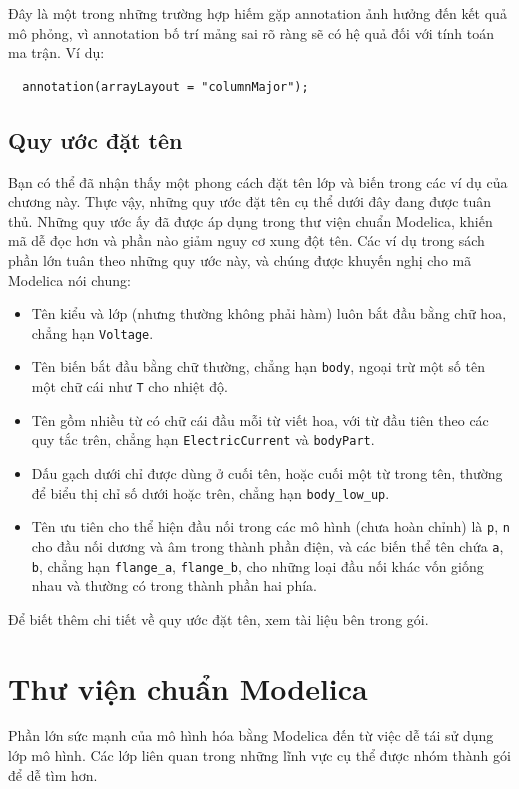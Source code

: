 Đây là một trong những trường hợp hiếm gặp annotation ảnh hưởng đến kết quả mô phỏng, vì annotation bố trí mảng sai rõ ràng sẽ có hệ quả đối với tính toán ma trận. Ví dụ:
\begin{verbatim}
  annotation(arrayLayout = "columnMajor");
\end{verbatim}

\subsection{Quy ước đặt tên}
Bạn có thể đã nhận thấy một phong cách đặt tên lớp và biến trong các ví dụ của chương này. Thực vậy, những quy ước đặt tên cụ thể dưới đây đang được tuân thủ. Những quy ước ấy đã được
áp dụng trong thư viện chuẩn Modelica, khiến mã dễ đọc hơn và phần nào giảm nguy cơ xung đột tên. Các ví dụ trong sách phần lớn tuân theo những quy ước này, và chúng được khuyến nghị cho mã Modelica nói chung:
\begin{itemize}
\item Tên kiểu và lớp (nhưng thường không phải hàm) luôn bắt đầu bằng chữ hoa, chẳng hạn \texttt{Voltage}.
\item Tên biến bắt đầu bằng chữ thường, chẳng hạn \texttt{body}, ngoại trừ một số tên một chữ cái như \texttt{T} cho nhiệt độ.
\item Tên gồm nhiều từ có chữ cái đầu mỗi từ viết hoa, với từ đầu tiên theo các quy tắc trên, chẳng hạn \texttt{ElectricCurrent} và \texttt{bodyPart}.
\item Dấu gạch dưới chỉ được dùng ở cuối tên, hoặc cuối một từ trong tên, thường để biểu thị chỉ số dưới hoặc trên, chẳng hạn \texttt{body\_low\_up}.
\item Tên ưu tiên cho thể hiện đầu nối trong các mô hình (chưa hoàn chỉnh) là \texttt{p}, \texttt{n} cho đầu nối dương và âm trong thành phần điện, và các biến thể tên chứa \texttt{a}, \texttt{b}, chẳng hạn \texttt{flange\_a}, \texttt{flange\_b}, cho những loại đầu nối khác vốn giống nhau và thường có trong thành phần hai phía.
\end{itemize}
Để biết thêm chi tiết về quy ước đặt tên, xem tài liệu bên trong gói.

\section{Thư viện chuẩn Modelica}
Phần lớn sức mạnh của mô hình hóa bằng Modelica đến từ việc dễ tái sử dụng lớp mô hình. Các lớp liên quan trong những lĩnh vực cụ thể được nhóm thành gói để dễ tìm hơn.

